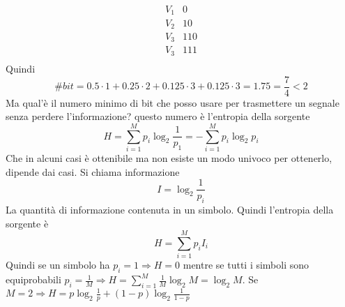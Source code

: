 \documentclass{article}
\begin{document}
\[\begin{matrix}
    V_1&0\\
    V_2&10\\
    V_3&110\\
    V_3&111\\
\end{matrix}\]
Quindi
\[\#bit=0.5\cdot 1+0.25\cdot 2+0.125\cdot 3+0.125\cdot 3=1.75=\frac{7}{4}<2\]
Ma qual'è il numero minimo di bit che posso usare per trasmettere un segnale senza perdere l'informazione? questo numero è l'entropia della sorgente
\[H=\sum_{i=1}^M p_i\log_{2}\frac{1}{p_1}=-\sum_{i=1}^M p_i\log_2 p_i\]
Che in alcuni casi è ottenibile ma non esiste un modo univoco per ottenerlo, dipende dai casi. Si chiama informazione
\[I=\log_2\frac{1}{p_i}\]
La quantità di informazione contenuta in un simbolo. Quindi l'entropia della sorgente è
\[H=\sum_{i=1}^M p_i I_i\]
Quindi se un simbolo ha \(p_i=1\Rightarrow H=0\) mentre se tutti i simboli sono equiprobabili \(p_i=\frac{1}{M}\Rightarrow H=\sum_{i=1}^M\frac{1}{M}\log_2 M=\log_2 M\). Se \(M=2\Rightarrow H=p\log_2\frac{1}{p}+(1-p)\log_2\frac{1}{1-p}\)
\end{document}
